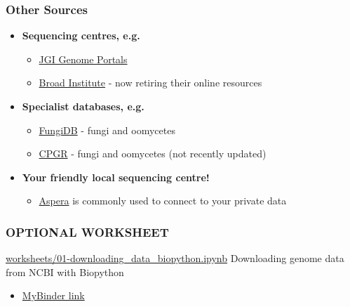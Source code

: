 \begin{frame}
  \frametitle{Other Sources}
    \begin{itemize}
      \item \textcolor{hutton_green}{\textbf{Sequencing centres, e.g.}}
      \begin{itemize}
        \item \textcolor{hutton_purple}{\href{http://genome.jgi.doe.gov/}{JGI Genome Portals}}
        \item \textcolor{hutton_purple}{\href{https://www.broadinstitute.org/}{Broad Institute}} - now retiring their online resources
      \end{itemize}
      \item \textcolor{hutton_blue}{\textbf{Specialist databases, e.g.}}
      \begin{itemize}
        \item \textcolor{hutton_purple}{\href{http://fungidb.org/fungidb/}{FungiDB}} - fungi and oomycetes
        \item \textcolor{hutton_purple}{\href{http://cpgr.plantbiology.msu.edu/}{CPGR}} - fungi and oomycetes (not recently updated)
      \end{itemize}
      \item \textcolor{RawSienna}{\textbf{Your friendly local sequencing centre!}}
      \begin{itemize}
        \item \textcolor{hutton_purple}{\href{http://asperasoft.com/}{Aspera}} is commonly used to connect to your private data
      \end{itemize}
    \end{itemize}
\end{frame}

\begin{frame}
  \frametitle{OPTIONAL WORKSHEET}
  \begin{alertblock}{\url{worksheets/01-downloading_data_biopython.ipynb}}
    Downloading genome data from NCBI with Biopython
  \end{alertblock}
  \begin{itemize}
    \item \textcolor{hutton_purple}{\href{http://mybinder.org/repo/widdowquinn/Teaching-EMBL-Plant-Path-Genomics}{MyBinder link}}
  \end{itemize}
\end{frame}